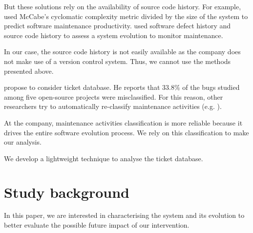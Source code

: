 \documentclass[10pt,conference]{IEEEtran}
\begin{document}

But these solutions rely on the availability of source code history. 
For example, \cite{gill91} used McCabe’s cyclomatic complexity metric divided by the size of the system to predict software maintenance productivity.
\cite{port18,Zhan10a} used software defect history and source code history to assess a system evolution to monitor maintenance. 

In our case, the source code history is not easily available as the company does not make use of a version control system.
Thus, we cannot use the methods presented above.

\cite{Herz13a} propose to consider ticket database.
He reports that $33.8\%$ of the bugs studied among five open-source projects were misclassified.
For this reason, other researchers try to automatically re-classify maintenance activities (e.g. \cite{Mock20a,Levin19a}).
 
At the company, maintenance activities classification is more reliable because it drives the entire software evolution process.
We rely on this classification to make our analysis.

We develop a lightweight technique to analyse the ticket database.


\section{Study background}
\label{sec:background}

In this paper, we are interested in characterising the system and its evolution to better evaluate the possible future impact of our intervention. 
\end{document}
